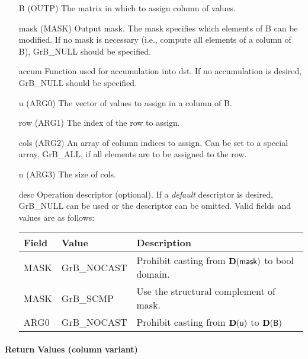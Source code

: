 \begin{itemize}[leftmargin=1.1in]
    \item[{\sf B}]   ({\sf OUTP}) The matrix in which to assign column of values.

    \item[{\sf mask}] ({\sf MASK}) Output mask. The mask specifies which elements
    of {\sf B} can be modified. If no mask is necessary (i.e., compute all
    elements of a column of {\sf B}), {\sf GrB\_NULL} should be specified.

    \item[{\sf accum}] Function used for accumulation into {\sf dst}.  If no accumulation
                        is desired, {\sf GrB\_NULL} should be specified.

    \item[{\sf u}]   ({\sf ARG0}) The vector of values to assign in a column of {\sf B}.

    \item[{\sf row}]     ({\sf ARG1}) The index of the row to assign.
    \item[{\sf cols}]     ({\sf ARG2}) An array of column indices to assign. Can
                              be set to a special array, {\sf GrB\_ALL}, if all elements
                              are to be assigned to the row.
    \item[{\sf n}]    ({\sf ARG3}) The size of {\sf cols}.

    \item[{\sf desc}]   Operation descriptor (optional). If a
    \emph{default} descriptor is desired, {\sf GrB\_NULL} can be
    used or the descriptor can be omitted.  Valid fields and values are as follows: \\
    \begin{tabular}{lll}
    Field  & Value & Description \\
    \hline
    {\sf MASK} & {\sf GrB\_NOCAST} & Prohibit casting from $\bold{D}({\sf mask})$ to {\sf bool} domain. \\
    {\sf MASK} & {\sf GrB\_SCMP} & Use the structural complement of {\sf mask}. \\
    {\sf ARG0} & {\sf GrB\_NOCAST} & Prohibit casting from $\bold{D}({\sf u})$ to $\bold{D}({\sf B})$ \\
    \end{tabular}

\end{itemize}

\paragraph{Return Values (column variant)}

